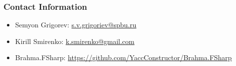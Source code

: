 \documentclass[xcolor=table]{beamer}
\begin{document}
\begin{frame}
\transwipe[direction=90]
\frametitle{Contact Information}
\begin{itemize}
  \item Semyon Grigorev: \href{mailto:s.v.grigoriev@spbu.ru}{s.v.grigoriev@spbu.ru}
  \item Kirill Smirenko: \href{mailto:k.smirenko@gmail.com}{k.smirenko@gmail.com}
\end{itemize}
\begin{itemize}
  \item Brahma.FSharp: \href{https://github.com/YaccConstructor/Brahma.FSharp}{https://github.com/YaccConstructor/Brahma.FSharp}
\end{itemize}
\end{frame}
\end{document}
